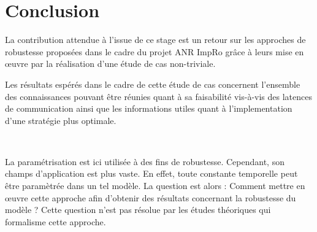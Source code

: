 \documentclass{article}
\begin{document}
  \section{Conclusion}

    La contribution attendue à l'issue de ce stage est un retour sur les
    approches de robustesse proposées dans le cadre du projet ANR ImpRo grâce à
    leurs mise en \oe uvre par la réalisation d'une étude de cas non-triviale.
    
    Les résultats espérés dans le cadre de cette étude de cas concernent
    l'ensemble des connaissances pouvant être réunies quant à sa faisabilité
    vis-à-vis des latences de communication ainsi que les informations utiles
    quant à l'implementation d'une stratégie plus optimale.

    ~


    La paramétrisation est ici utilisée à des fins de robustesse. Cependant, son
    champs d'application est plus vaste. En effet, toute constante temporelle
    peut être paramètrée dans un tel modèle. La question est alors : Comment
    mettre en \oe uvre cette approche afin d'obtenir des résultats concernant la
    robustesse du modèle ? Cette question n'est pas résolue par les études
    théoriques qui formalisme cette approche.

  \newpage
  \appendix
    
    
\end{document}

